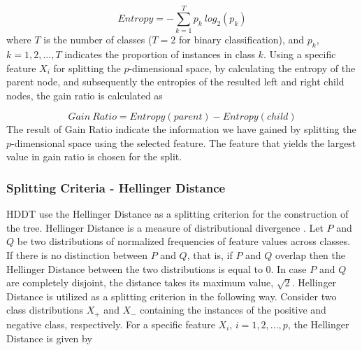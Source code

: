 \documentclass{acm_proc_article-sp}
\begin{document}
\begin{equation*}
	Entropy = -\sum_{k = 1}^{T}p_k \ log_2(p_k)
\end{equation*}
where $T$ is the number of classes ($T=2$ for binary classification), and $p_k$, $k = 1,2,...,T$ indicates the proportion of instances in class $k$. Using a specific feature $X_i$ for splitting the $p$-dimensional space, by calculating the entropy of the parent node, and subsequently the entropies of the resulted left and right child nodes, the gain ratio is calculated as 

\begin{equation*}
	Gain \ Ratio = Entropy(parent) - Entropy(child)
\end{equation*} 
The result of Gain Ratio indicate the information we have gained by splitting the $p$-dimensional space using the selected feature. The feature that yields the largest value in gain ratio is chosen for the split.

\subsubsection{Splitting Criteria - Hellinger Distance}
HDDT use the Hellinger Distance as a splitting criterion for the construction of the tree. Hellinger Distance is a measure of distributional divergence \cite{Cieslak2008}. Let $P$ and $Q$ be two distributions of normalized frequencies of feature values across classes. If there is no distinction between $P$ and $Q$, that is, if $P$ and $Q$ overlap then the Hellinger Distance between the two distributions is equal to 0. In case $P$ and $Q$ are completely disjoint, the distance takes its  maximum value, $\sqrt{2}$. Hellinger Distance is utilized as a splitting criterion in the following way. Consider two class distributions $X_+$ and $X_-$ containing the instances of the positive and negative class, respectively. For a specific feature $X_i$, $i = 1,2,...,p$, the Hellinger Distance is given by 
\end{document}
